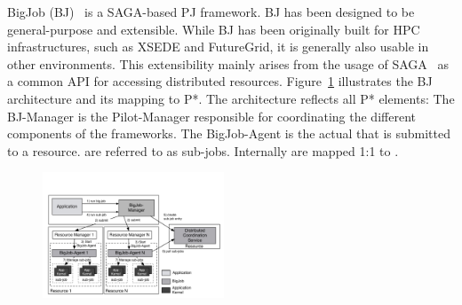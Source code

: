 \documentclass[conference]{IEEEtran}
\begin{document}

BigJob (BJ)~\cite{bigjob_web,saga_bigjob_condor_cloud} is a SAGA-based PJ
framework. BJ has been designed to be general-purpose and extensible. While BJ
has been originally built for HPC infrastructures, such as XSEDE and
FutureGrid, it is generally also usable in other environments. This
extensibility mainly arises from the usage of SAGA~\cite{saga_url,ogf-gfd-90} 
as a common API for accessing distributed resources. 
Figure~\ref{fig:figures_re_bigjob_interactions} illustrates the
BJ architecture and its mapping to P*. The architecture reflects
all P* elements: The BJ-Manager is the Pilot-Manager responsible for
coordinating the different components of the frameworks. The
BigJob-Agent is the actual \pilot that is submitted to a
resource. \cus are referred to as sub-jobs. Internally \cus are mapped
1:1 to \sus.


\begin{figure}[t]
	\up\upp
	\centering
	\includegraphics[width=0.48\textwidth]{../figures/re_bigjob_interactions.pdf}
	\caption{}
	\label{fig:figures_re_bigjob_interactions}
\end{figure}
\end{document}
